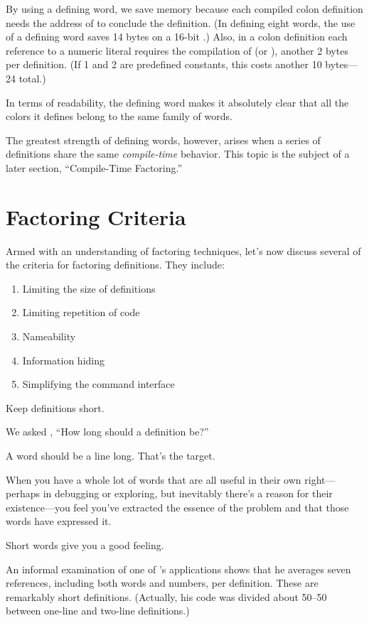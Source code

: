 By using a defining word, we save memory because each compiled colon
definition needs the address of  to conclude the
definition. (In defining eight words, the use of a defining word saves
14 bytes on a 16-bit \Forth{}.) Also, in a colon definition each
reference to a numeric literal requires the compilation of
 (or ), another 2 bytes per
definition. (If 1 and 2 are predefined constants, this costs another
10 bytes---24 total.)

In terms of readability, the defining word makes it absolutely clear
that all the colors it defines belong to the same family of words.

The greatest strength of defining words, however, arises when a series
of definitions share the same \emph{compile-time} behavior. This topic
is the subject of a later section, ``Compile-Time Factoring.''

\section{Factoring Criteria}
Armed with an understanding of factoring techniques, let's now discuss
several of the criteria for factoring \Forth{} definitions. They
include:

\begin{enumerate}
\item Limiting the size of definitions
\item Limiting repetition of code
\item Nameability
\item Information hiding
\item Simplifying the command interface
\end{enumerate}

\begin{tip}
Keep definitions short.
\end{tip}

\begin{interview}
We asked ,
``How long should a \Forth{} definition be?''

\begin{tfquot}
A word should be a line long. That's the target.

When you have a whole lot of words that are all useful in their own
right---perhaps in debugging or exploring, but inevitably there's a
reason for their existence---you feel you've extracted the essence of
the problem and that those words have expressed it.

Short words give you a good feeling.
\end{tfquot}
\end{interview}
An informal examination of one of 's applications shows
that he averages seven references, including both words and numbers,
per definition. These are remarkably short definitions. (Actually, his
code was divided about 50--50 between one-line and two-line
definitions.)

